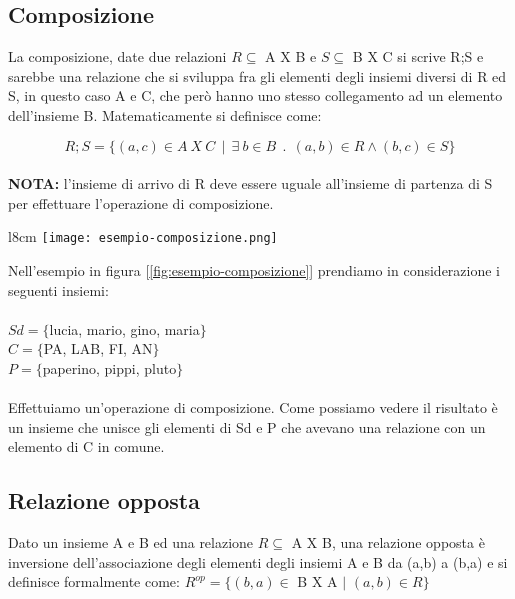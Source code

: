 \subsection{Composizione}
\begin{definition}[Composizione]
La composizione, date due relazioni $R \subseteq$ A X B e $S \subseteq$ B X C si scrive R;S e sarebbe una relazione che si sviluppa fra gli elementi degli insiemi diversi di R ed S, in questo caso A e C, che però hanno uno stesso collegamento ad un elemento dell'insieme B. Matematicamente si definisce come:
\end{definition}

\begin{equation}
    R;S = \{(a, c) \in A \: X \: C \: \: | \: \: \exists \: b \in B \: \: . \: \: (a,b) \in R  \land (b,c) \in S\}
\end{equation}
\\
\textbf{NOTA:} l'insieme di arrivo di R deve essere uguale all'insieme di partenza di S per effettuare l'operazione di composizione.
\\
\begin{wrapfigure}{l}{8cm}
    \vspace{-15pt}
    \centering
    \texttt{[image: esempio-composizione.png]}
    \caption{Esempio composizione}
    \label{fig:esempio-composizione}
\end{wrapfigure}
\begin{example}
\vspace{-15pt}
Nell'esempio in figura [\ref{fig:esempio-composizione}] prendiamo in considerazione i seguenti insiemi:\\ \\
$Sd = \{$lucia, mario, gino, maria$\}$\\
$C = \{$PA, LAB, FI, AN$\}$\\
$P = \{$paperino, pippi, pluto$\}$ \\ \\
Effettuiamo un'operazione di composizione. Come possiamo vedere il risultato è un insieme che unisce gli elementi di Sd e P che avevano una relazione con un elemento di C in comune.\\
\end{example}

\subsection{Relazione opposta}
\begin{definition}
Dato un insieme A e B ed una relazione $R \subseteq$ A X B, una relazione opposta è inversione dell'associazione degli elementi degli insiemi A e B da (a,b) a (b,a) e si definisce formalmente come: $R^{op} = \{(b, a) \in$ B X A $|$ $(a,b) \in R\}$
\end{definition}


